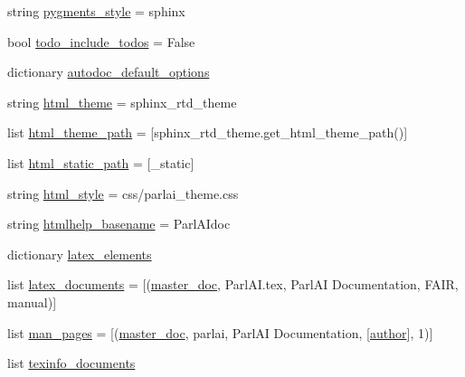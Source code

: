 \begin{DoxyCompactItemize}
string \hyperlink{namespaceconf_a641130e096b26cba8a5d63ed38684de7}{pygments\+\_\+style} = \textquotesingle{}sphinx\textquotesingle{}
\item 
bool \hyperlink{namespaceconf_a8fe7f0d85f975f4ecba5cb6066959a09}{todo\+\_\+include\+\_\+todos} = False
\item 
dictionary \hyperlink{namespaceconf_ae1323788e132618f5d7b9839f2adc5e3}{autodoc\+\_\+default\+\_\+options}
\item 
string \hyperlink{namespaceconf_a6c3bfcc1a44546c1c75ce20f55bd0fd6}{html\+\_\+theme} = \textquotesingle{}sphinx\+\_\+rtd\+\_\+theme\textquotesingle{}
\item 
list \hyperlink{namespaceconf_a4960231f83b1b44a1ffcd212903b62e8}{html\+\_\+theme\+\_\+path} = \mbox{[}sphinx\+\_\+rtd\+\_\+theme.\+get\+\_\+html\+\_\+theme\+\_\+path()\mbox{]}
\item 
list \hyperlink{namespaceconf_af4fb5d8851ccaade135c2668dd3ced41}{html\+\_\+static\+\_\+path} = \mbox{[}\textquotesingle{}\+\_\+static\textquotesingle{}\mbox{]}
\item 
string \hyperlink{namespaceconf_a5622a8722272baed29b41d8771ecbe3c}{html\+\_\+style} = \textquotesingle{}css/parlai\+\_\+theme.\+css\textquotesingle{}
\item 
string \hyperlink{namespaceconf_aab7fddb2766ce3c430d8246fbfdbc7b1}{htmlhelp\+\_\+basename} = \textquotesingle{}Parl\+A\+Idoc\textquotesingle{}
\item 
dictionary \hyperlink{namespaceconf_a33619d385ad23765ac6ebb58bf82d43d}{latex\+\_\+elements}
\item 
list \hyperlink{namespaceconf_a7812f49970f3de0d15dd7b9b9a10e3a1}{latex\+\_\+documents} = \mbox{[}(\hyperlink{namespaceconf_a6fcd7e5236f355b1e1a55f9d95988810}{master\+\_\+doc}, \textquotesingle{}Parl\+A\+I.\+tex\textquotesingle{}, \textquotesingle{}Parl\+AI Documentation\textquotesingle{}, \textquotesingle{}F\+A\+IR\textquotesingle{}, \textquotesingle{}manual\textquotesingle{})\mbox{]}
\item 
list \hyperlink{namespaceconf_a85efc5fee48a26fa2d651f6eeb38fc2b}{man\+\_\+pages} = \mbox{[}(\hyperlink{namespaceconf_a6fcd7e5236f355b1e1a55f9d95988810}{master\+\_\+doc}, \textquotesingle{}parlai\textquotesingle{}, \textquotesingle{}Parl\+AI Documentation\textquotesingle{}, \mbox{[}\hyperlink{namespaceconf_a637c239d256432248aa8d9f3ab0b8c52}{author}\mbox{]}, 1)\mbox{]}
\item 
list \hyperlink{namespaceconf_a54b0faed214ac92017d5689efbb10672}{texinfo\+\_\+documents}
\end{DoxyCompactItemize}


